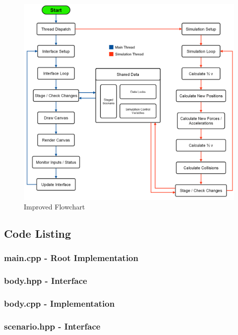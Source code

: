 {\begin{figure}[!ht]
  \centering
  \includegraphics[scale=1]{../img/flowchartNew.png} 
  \caption{Improved Flowchart}
\end{figure}

\pagebreak
\subsection{Code Listing}
\subsubsection{main.cpp - Root Implementation}
\texttt{} 
\pagebreak
\subsubsection{body.hpp - Interface}
\texttt{} 
\pagebreak
\subsubsection{body.cpp - Implementation}
\texttt{} 
\pagebreak
\subsubsection{scenario.hpp - Interface}
\texttt{} 
\pagebreak
}
